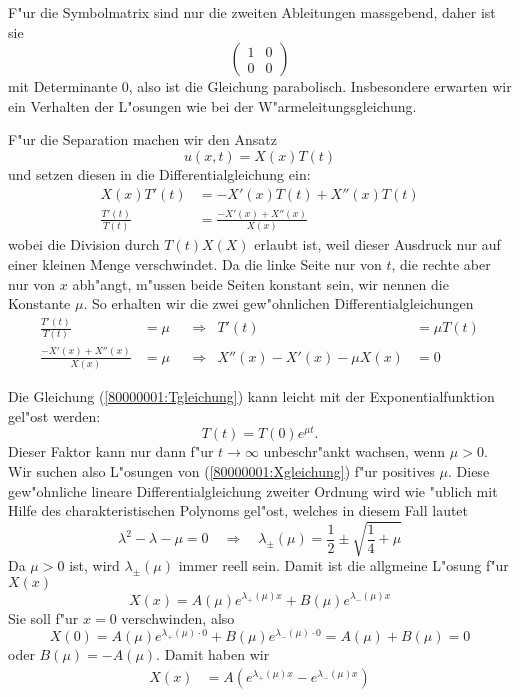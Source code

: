 \begin{loesung}
\begin{teilaufgaben}
\item F"ur die Symbolmatrix sind nur die zweiten Ableitungen massgebend,
daher ist sie
\[
\begin{pmatrix}
1&0\\
0&0
\end{pmatrix}
\]
mit Determinante $0$, also ist die Gleichung parabolisch.
Insbesondere erwarten wir ein Verhalten der L"osungen wie
bei der W"armeleitungsgleichung.
\item F"ur die Separation machen wir den Ansatz
\[
u(x,t)=X(x)T(t)
\]
und setzen diesen in die Differentialgleichung ein:
\begin{align*}
X(x)T'(t)&=-X'(x)T(t)+X''(x)T(t)\\
\frac{T'(t)}{T(t)}&=\frac{-X'(x)+X''(x)}{X(x)}
\end{align*}
wobei die Division durch $T(t)X(X)$ erlaubt ist, weil
dieser Ausdruck nur auf einer kleinen Menge verschwindet.
Da die linke Seite nur von $t$, die rechte aber nur von $x$ abh"angt,
m"ussen beide Seiten konstant sein, wir nennen die Konstante
$\mu$. So erhalten wir die zwei gew"ohnlichen Differentialgleichungen
\begin{align}
\frac{T'(t)}{T(t)}&=\mu&&\Rightarrow&T'(t)&=\mu T(t)
\label{80000001:Tgleichung}
\\
\frac{-X'(x)+X''(x)}{X(x)}&=\mu&&\Rightarrow&X''(x)-X'(x)-\mu X(x)&=0
\label{80000001:Xgleichung}
\end{align}
\item
Die Gleichung (\ref{80000001:Tgleichung}) kann leicht mit der Exponentialfunktion
gel"ost werden:
\[
T(t)=T(0)e^{\mu t}.
\]
Dieser Faktor kann nur dann f"ur $t\to\infty$ unbeschr"ankt wachsen, wenn
$\mu > 0$. Wir suchen also L"osungen von (\ref{80000001:Xgleichung}) f"ur
positives $\mu$.
Diese gew"ohnliche lineare Differentialgleichung zweiter Ordnung wird
wie "ublich mit Hilfe des charakteristischen Polynoms gel"ost, welches
in diesem Fall lautet
\[
\lambda^2-\lambda-\mu=0
\quad
\Rightarrow
\quad
\lambda_{\pm}(\mu)=\frac12\pm\sqrt{\frac14+\mu}
\]
Da $\mu > 0$ ist, wird $\lambda_{\pm}(\mu)$ immer reell sein.
Damit ist die allgmeine L"osung f"ur $X(x)$
\[
X(x)=
A(\mu)e^{\lambda_+(\mu)x}
+
B(\mu)e^{\lambda_-(\mu)x}
\]
Sie soll f"ur $x=0$ verschwinden, also
\[
X(0)=
A(\mu)e^{\lambda_+(\mu)\cdot 0}
+
B(\mu)e^{\lambda_-(\mu)\cdot 0}
=A(\mu)+B(\mu)=0
\]
oder $B(\mu)=-A(\mu)$. Damit haben wir
\begin{align*}
X(x)&=A(e^{\lambda_+(\mu)x}-e^{\lambda_-(\mu)x})

\end{align*}
\end{teilaufgaben}
\end{loesung}
